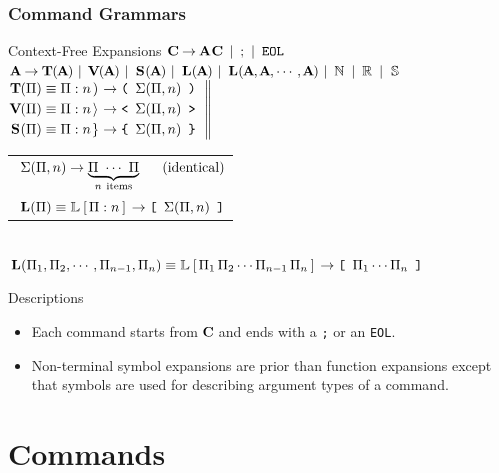 \documentclass[10pt]{beamer}
\begin{document}
\begin{frame}[t] \frametitle{Command Grammars}

	\begin{block}{Context-Free Expansions}
		$\left.\CMD \EXP \ARG \CMD \SEP \,\text{;}\, \SEP \,\texttt{EOL} \right.$ \\ [.24em]
		$\left.\ARG \EXP \TUP(\ARG) \SEP \VCT(\ARG) \SEP \SET(\ARG) \SEP
		 \LST(\ARG) \SEP \LST(\ARG, \ARG, \cdots, \ARG) \SEP \MSN \SEP \MSR \SEP \MSS \right.$ \\ [.27em]
		$\left.\text{%
		\begin{tabular}{@{}l}%
			$\TUP(\Pi) \EQV \Tup{\Pi}{n} \EXP \texttt{\TupBrkL}     \ \, \Sigma(\Pi, n) \ \, \texttt{\TupBrkR}$ \\ [.24em]
			$\VCT(\Pi) \EQV \Vct{\Pi}{n} \EXP \texttt{\VctBrkTextL} \ \, \Sigma(\Pi, n) \ \, \texttt{\VctBrkTextR}$ \\ [.24em]
			$\SET(\Pi) \EQV \Set{\Pi}{n} \EXP \texttt{\SetBrkL}     \ \, \Sigma(\Pi, n) \ \, \texttt{\SetBrkR}$
		\end{tabular}} \right\|\kern.128em$%
		\begin{tabular}{@{}l}%
			$\ \Sigma(\Pi, n) \rightarrow \underbrace{\Pi \ \cdots \ \Pi}_{n \ \text{items}} \quad\,\ \text{(identical)}$ \\ [1.725em]
			$\ \LST(\Pi) \EQV \Lst{\Pi}{n} \EXP \texttt{\LstBrkL} \ \, \Sigma(\Pi, n) \ \, \texttt{\LstBrkR}$
		\end{tabular} \\ [.24em]
		$\left.\LST(\Pi_1,\Pi_2,\cdots,\Pi_{n-1},\Pi_n) \EQV \LstFull{\Pi_1\,\Pi_2\cdots\Pi_{n-1}\,\Pi_n} \EXP
		 \texttt{\LstBrkL} \ \, \Pi_1\cdots\Pi_n \ \, \texttt{\LstBrkR}\right.$
	\end{block}

	\begin{block}{Descriptions}
		\begin{itemize}
			\item Each command starts from $\CMD$ and ends with a \texttt{;} or an \texttt{EOL}.
			\item Non-terminal symbol expansions are prior than function expansions except that symbols are used for describing argument types of a command.
		\end{itemize}
	\end{block}

\end{frame}


\section{Commands}
\end{document}
